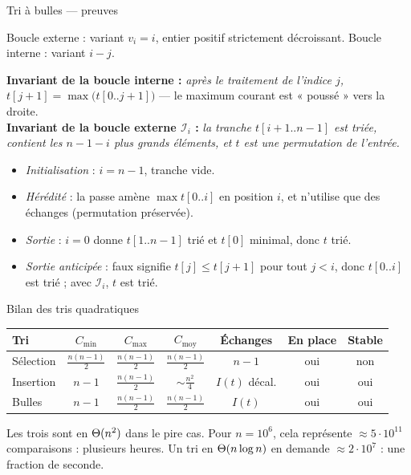 \documentclass[11pt,aspectratio=169]{beamer}
\begin{document}
\begin{frame}[shrink=15]{Tri à bulles --- preuves}
\begin{terminaisonit}
Boucle externe : variant $v_i=i$, entier positif strictement décroissant.
Boucle interne : variant $i-j$.
\end{terminaisonit}
\vspace{3pt}
\begin{correction}
\small
\textbf{Invariant de la boucle interne :} \emph{après le traitement de l'indice $j$,
$t[j+1]=\max\big(t[0..j+1]\big)$} --- le maximum courant est « poussé » vers la droite.\\[2pt]
\textbf{Invariant de la boucle externe $\mathcal I_i$ :} \emph{la tranche $t[i+1..n-1]$ est
triée, contient les $n-1-i$ plus grands éléments, et $t$ est une permutation de l'entrée.}
\begin{itemize}\setlength\itemsep{1pt}
  \item \emph{Initialisation} : $i=n-1$, tranche vide.
  \item \emph{Hérédité} : la passe amène $\max t[0..i]$ en position $i$, et n'utilise que des
        échanges (permutation préservée).
  \item \emph{Sortie} : $i=0$ donne $t[1..n-1]$ trié et $t[0]$ minimal, donc $t$ trié.
  \item \emph{Sortie anticipée} :  faux signifie $t[j]\le t[j+1]$ pour tout
        $j<i$, donc $t[0..i]$ est trié ; avec $\mathcal I_i$, $t$ est trié.
\end{itemize}
\end{correction}
\end{frame}

\begin{frame}{Bilan des tris quadratiques}
\begin{center}\small
\begin{tabular}{lcccccc}
\toprule
\textbf{Tri} & $C_{\min}$ & $C_{\max}$ & $C_{\text{moy}}$ & \textbf{Échanges} & \textbf{En place} & \textbf{Stable}\\
\midrule
Sélection & $\frac{n(n-1)}2$ & $\frac{n(n-1)}2$ & $\frac{n(n-1)}2$ & $n-1$ & oui & non\\
Insertion & $n-1$ & $\frac{n(n-1)}2$ & $\sim\frac{n^2}4$ & $I(t)$ décal. & oui & oui\\
Bulles & $n-1$ & $\frac{n(n-1)}2$ & $\frac{n(n-1)}2$ & $I(t)$ & oui & oui\\
\bottomrule
\end{tabular}
\end{center}
\vspace{6pt}
\begin{attention}\small
Les trois sont en $\Theta(n^2)$ dans le pire cas. Pour $n=10^6$, cela représente
$\approx 5\cdot10^{11}$ comparaisons : plusieurs heures. Un tri en $\Theta(n\log n)$ en demande
$\approx 2\cdot 10^7$ : une fraction de seconde.
\end{attention}
\vspace{2pt}
\centering{}
\end{frame}
\end{document}
